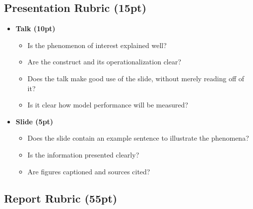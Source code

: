 \documentclass[12pt,table]{article}
\begin{document}
\subsection*{Presentation Rubric (15pt)}

\begin{itemize}
\item \textbf{Talk (10pt)}
\begin{itemize}
\item Is the phenomenon of interest explained well?
\item Are the construct and its operationalization clear?
\item Does the talk make good use of the slide, without merely reading off of it?
\item Is it clear how model performance will be measured?
\end{itemize}
\item \textbf{Slide (5pt)}
\begin{itemize}
\item Does the slide contain an example sentence to illustrate the phenomena?
\item Is the information presented clearly?
\item Are figures captioned and sources cited?
\end{itemize}
\end{itemize}

\subsection*{Report Rubric (55pt)}
\end{document}
